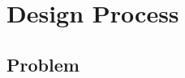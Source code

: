 \documentclass[conference]{IEEEtran}
\begin{document}
%




\section{Design Process}
\subsection{Problem}
\end{document}
